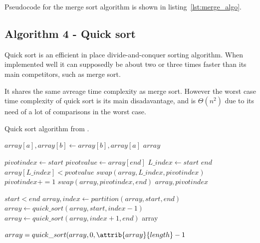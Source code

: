 \documentclass[sigconf, nonacm, natbib, screen, balance=False]{acmart}
\begin{document}
Pseudocode for the merge sort algorithm is shown in listing~\ref{lst:merge_algo}. 

\subsection{Algorithm 4 - Quick sort}\label{sec:algo2}

Quick sort is an efficient in place divide-and-conquer sorting algorithm. When implemented well it can supposedly be about two or three times faster than its main competitors, such as merge sort. 

It shares the same avreage time complexity as merge sort. However the worst case time complexity of quick sort is its main disadavantage, and is $\Theta(n^2)$ due to its need of a lot of comparisons in the worst case.  

\begin{listing}
  \caption{Quick sort algorithm from \citet[Ch.~2.1]{CLRS_2009}.}
  \label{lst:quick_algo}
  
  \begin{codebox}
    \li $array[a], array[b] \gets array[b], array[a]$
    \li \Return $array$
  \end{codebox}

  \begin{codebox}
    \li $pivotindex \gets start$
    \li $pivotvalue \gets array[end]$
    \li \For $L\_index \gets start$ \To $end$ 
    \li \Do
    \If $array[L\_index] < pvotvalue$
    \li \Do
    $swap(array, L\_index, pivotindex)$
    \li $pivotindex += 1$
    \End
    \End
    \li $swap(array, pivotindex, end)$
    \li \Return $array, pivotindex$

  \end{codebox}

  \begin{codebox}
    \li \If $start < end$
    \li \Do
    $array, index \gets partition(array, start, end)$
    \li $array \gets quick\_sort(array, start, index-1)$
    \li $array \gets quick\_sort(array, index+1, end)$
    \li \Return array
  \end{codebox}

  \begin{codebox}
    \li $array = quick\_sort(array, 0, \attrib{array}{length} - 1$

  \end{codebox}

\end{listing}
\end{document}
